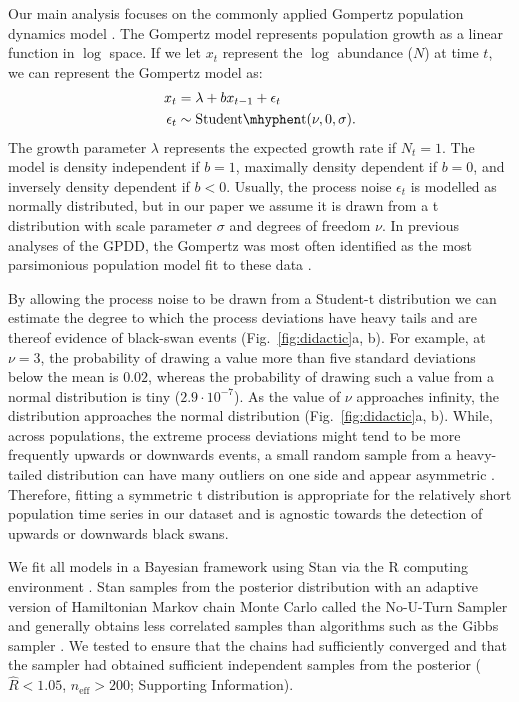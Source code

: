Our main analysis focuses on the commonly applied Gompertz population dynamics
model \citep[e.g.][]{knape2012,dennis2014,connors2014}. The Gompertz model
represents population growth as a linear function in $\log$ space. If we let
$x_t$ represent the $\log$ abundance ($N$) at time $t$, we can represent the
Gompertz model as:
\begin{align*}
x_t &= \lambda + b x_{t-1} + \epsilon_t\\
\epsilon_t &\sim \mathrm{Student\mhyphen t}(\nu, 0, \sigma).
\end{align*}
The growth parameter $\lambda$ represents the expected growth rate if $N_t =
1$. The model is density independent if $b = 1$, maximally density dependent
if $b = 0$, and inversely density dependent if $b < 0$. Usually, the process
noise $\epsilon_t$ is modelled as normally distributed, but in our paper we
assume it is drawn from a t distribution with scale parameter $\sigma$ and
degrees of freedom $\nu$. In previous analyses of the GPDD, the Gompertz was
most often identified as the most parsimonious population model fit to these
data \citep{brook2006}.

By allowing the process noise to be drawn from a Student-t distribution we can
estimate the degree to which the process deviations have heavy tails and are
thereof evidence of black-swan events (Fig.~\ref{fig:didactic}a, b). For
example, at $\nu = 3$, the probability of drawing a value more than five
standard deviations below the mean is $0.02$, whereas the probability of
drawing such a value from a normal distribution is tiny ($2.9\cdot10^{-7}$).
As the value of $\nu$ approaches infinity, the distribution approaches the
normal distribution (Fig.~\ref{fig:didactic}a, b). While, across populations,
the extreme process deviations might tend to be more frequently upwards or
downwards events, a small random sample from a heavy-tailed distribution can
have many outliers on one side and appear asymmetric \citep{gelman2013a}.
Therefore, fitting a symmetric t distribution is appropriate for the
relatively short population time series in our dataset and is agnostic towards
the detection of upwards or downwards black swans.

We fit all models in a Bayesian framework using Stan \citep{stan-manual2014}
via the R computing environment \citep{r2014}. Stan samples from the posterior
distribution with an adaptive version of Hamiltonian Markov chain Monte Carlo
called the No-U-Turn Sampler and generally obtains less correlated samples
than algorithms such as the Gibbs sampler \citep{hoffman2014}. We tested to
ensure that the chains had sufficiently converged and that the sampler had
obtained sufficient independent samples from the posterior ($\widehat{R} <
1.05$, $n_\mathrm{eff} > 200$; Supporting Information).

